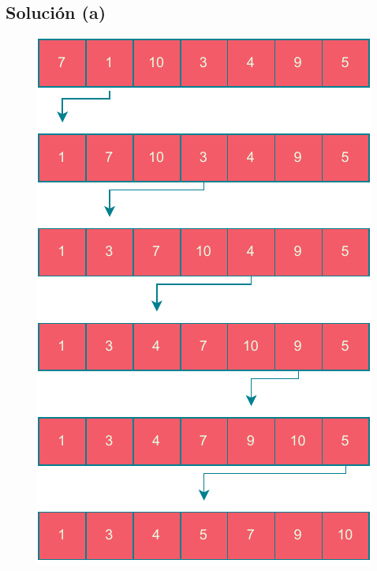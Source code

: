 \subsection{Solución (a)}
\begin{figure}[h]
    \centering
    \includegraphics[scale=0.6]{./estáticos/7a.pdf}
\end{figure}

